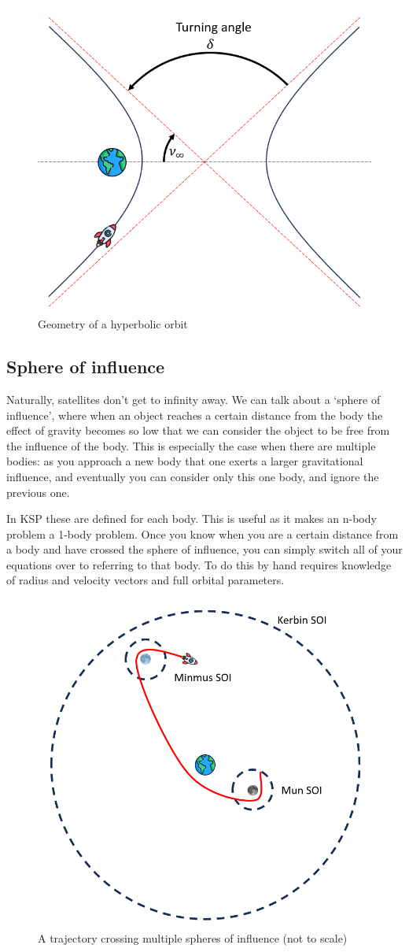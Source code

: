 \documentclass{report}
\begin{document}
\begin{figure}[H]
    \centering
    \includegraphics[width=0.5\linewidth]{Latex Images/HyperbolicOrbit.png}
    \caption{Geometry of a hyperbolic orbit}
    \label{fig:hyperbolic}
\end{figure}

\subsection{Sphere of influence}
Naturally, satellites don't get to infinity away. We can talk about a `sphere of influence', where when an object reaches a certain distance from the body the effect of gravity becomes so low that we can consider the object to be free from the influence of the body. This is especially the case when there are multiple bodies: as you approach a new body that one exerts a larger gravitational influence, and eventually you can consider only this one body, and ignore the previous one.

In KSP these are defined for each body. This is useful as it makes an n-body problem a 1-body problem. Once you know when you are a certain distance from a body and have crossed the sphere of influence, you can simply switch all of your equations over to referring to that body. To do this by hand requires knowledge of radius and velocity vectors and full orbital parameters.

\begin{figure}[H]
    \centering
    \includegraphics[width=0.5\linewidth]{Latex Images/SphereOfInfluence.png}
    \caption{A trajectory crossing multiple spheres of influence (not to scale)}
    \label{fig:SOI}
\end{figure}
\end{document}

